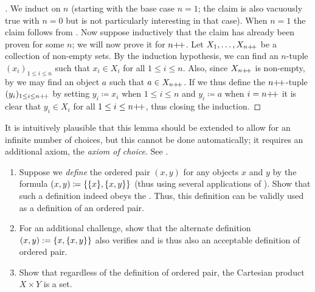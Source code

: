 \begin{proof}[]
  We induct on \(n\) (starting with the base case \(n = 1\); the claim is also vacuously true with \(n = 0\) but is not particularly interesting in that case).
  When \(n = 1\) the claim follows from .
  Now suppose inductively that the claim has already been proven for some \(n\);
  we will now prove it for \(n{+}\!{+}\).
  Let \(X_1, \dots, X_{n{+}\!{+}}\) be a collection of non-empty sets.
  By the induction hypothesis, we can find an \(n\)-tuple \((x_i)_{1 \leq i \leq n}\) such that \(x_i \in X_i\) for all \(1 \leq i \leq n\).
  Also, since \(X_{n{+}\!{+}}\) is non-empty, by  we may find an object \(a\) such that \(a \in X_{n{+}\!{+}}\).
  If we thus define the \(n{+}\!{+}\)-tuple \((y_i)_{1 \leq i \leq n{+}\!{+}}\) by setting \(y_i \coloneqq x_i\) when \(1 \leq i \leq n\) and \(y_i \coloneqq a\) when \(i = n{+}\!{+}\) it is clear that \(y_i \in X_i\) for all \(1 \leq i \leq n{+}\!{+}\), thus closing the induction.
\end{proof}

\begin{rmk}\label{i:3.5.13}
  It is intuitively plausible that this lemma should be extended to allow for an infinite number of choices, but this cannot be done automatically;
  it requires an additional axiom, the \emph{axiom of choice}.
  See .
\end{rmk}

\exercisesection

\begin{ex}\label{i:ex:3.5.1}
  \begin{enumerate}
    \item\label{i:ex:3.5.1.a} Suppose we \emph{define} the ordered pair \((x, y)\) for any objects \(x\) and \(y\) by the formula \((x, y) \coloneqq \set{\set{x}, \set{x, y}}\)
    (thus using several applications of ).
    Show that such a definition indeed obeys the .
    Thus, this definition can be validly used as a definition of an ordered pair.
    \item\label{i:ex:3.5.1.b} For an additional challenge, show that the alternate definition \((x, y) := \left\lbrace x, \left\lbrace x, y\right\rbrace\right\rbrace\) also verifies  and is thus also an acceptable definition of ordered pair.
    \item\label{i:ex:3.5.1.c} Show that regardless of the definition of ordered pair, the Cartesian product \(X \times Y\) is a set.
  \end{enumerate}
\end{ex}

